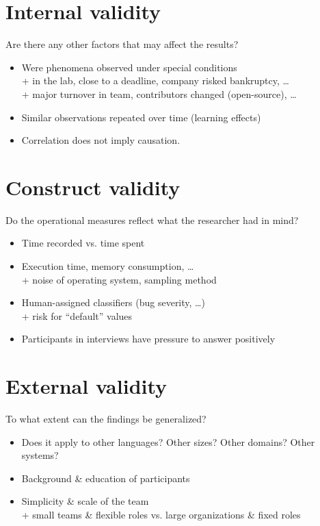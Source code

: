 \section{Internal validity}

Are there any other factors that may affect the results?
\begin{itemize}
  \item Were phenomena observed under special conditions \\
+ in the lab, close to a deadline, company risked bankruptcy, … \\
+ major turnover in team, contributors changed (open-source), …
  \item Similar observations repeated over time (learning effects)
  \item Correlation does not imply causation.
\end{itemize}

\section{Construct validity}

Do the operational measures reflect what the researcher had in mind?
\begin{itemize}
  \item Time recorded vs. time spent
  \item Execution time, memory consumption, … \\
+ noise of operating system, sampling method
  \item Human-assigned classifiers (bug severity, …) \\
+ risk for “default” values
  \item Participants in interviews have pressure to answer positively 
\end{itemize}

\section{External validity}

To what extent can the findings be generalized?
\begin{itemize}
  \item Does it apply to other languages? Other sizes? Other domains? Other systems?
  \item Background \& education of participants
  \item Simplicity \& scale of the team \\
+ small teams \& flexible roles vs. large organizations \& fixed roles
\end{itemize}